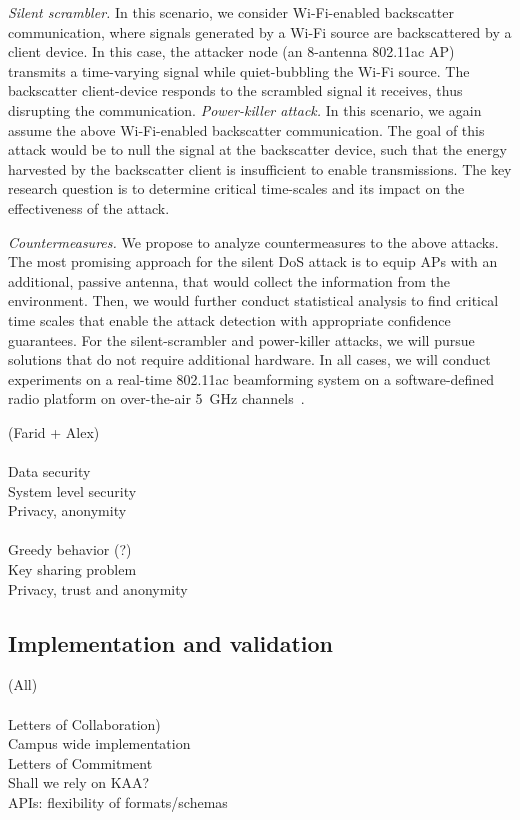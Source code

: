 \emph{Silent scrambler.} In this scenario, we consider Wi-Fi-enabled backscatter communication, where signals generated by a Wi-Fi source are backscattered by a client device. In this case, the attacker node (an 8-antenna 802.11ac AP) transmits a time-varying signal while quiet-bubbling the Wi-Fi source. The backscatter client-device responds to the scrambled signal it receives, thus disrupting the communication.
\emph{Power-killer attack.} In this scenario, we again assume the above Wi-Fi-enabled backscatter communication. The goal of this attack would be to null the signal at the backscatter device, such that the energy harvested by the backscatter client is insufficient to enable transmissions. The key research question is to determine critical time-scales and its impact on the effectiveness of the attack.

\emph{Countermeasures.} We propose to analyze countermeasures to the above attacks. The most promising approach for the silent DoS attack is to equip APs with an additional, passive antenna, that would collect the information from the environment. Then, we would further conduct statistical analysis to find critical time scales that enable the attack detection with appropriate confidence guarantees. For the silent-scrambler and power-killer attacks, we will pursue solutions that do not require additional hardware. In all cases, we will conduct experiments on a real-time 802.11ac beamforming system on a software-defined radio 
platform on over-the-air 5~GHz channels~\cite{warpProject}.



(Farid + Alex)\\
\\
Data security\\
System level security\\
Privacy, anonymity\\
\\
Greedy behavior (?)\\
Key sharing problem\\ 
Privacy, trust and anonymity \\

\subsection{Implementation and validation }
(All)\\
\\
Letters of Collaboration)\\
Campus wide implementation \\
Letters of Commitment\\
Shall we rely on KAA?\\
APIs: flexibility of formats/schemas\\

 
